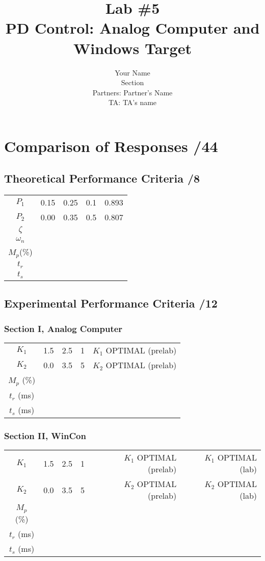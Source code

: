 \documentclass{article}
\title{Lab \#5\\{\sc PD Control: Analog Computer and Windows Target}}
\author{Your Name\\ Section\\
  Partners: Partner's Name\\
  TA: TA's name}
\newcommand{\score}{\hfill \underline{\hspace{1cm}}/}
\begin{document}
\maketitle
{}
\section{\sc Comparison of Responses \rm \score 44}
\subsection{Theoretical Performance Criteria \score 8}
\begin{center}
\begin{tabular}{crrrr}
$P_1$	&	0.15	&	0.25	&	0.1	&	0.893	\\
$P_2$	&	0.00	&	0.35	&	0.5	&	0.807	\\
\hline
$\zeta$	&	& & &	\\
$\omega_n$	& & &	\\
$M_p$(\%) & & &	\\
$t_r$	& & & &	\\
$t_s$	&	& & &	
\end{tabular}
\end{center}

\subsection{Experimental Performance Criteria \score 12}
\subsubsection{Section I, Analog Computer}
\begin{center}
\begin{tabular}{crrrr}
$K_1$	&	1.5	&	2.5	&	1	&	$K_1$ OPTIMAL (prelab) 	\\
$K_2$	&	0.0	&	3.5	&	5	&  $K_2$ OPTIMAL (prelab) \\
\hline
$M_p$ (\%)	& & & &			\\
$t_r$ (ms)	&	& & &		\\
$t_s$ (ms)	&	& & &	
\end{tabular}
\end{center}

\subsubsection{Section II, WinCon}
\begin{center}
\begin{tabular}{crrrrr}
$K_1$	&	1.5	&	2.5	&	1	&	$K_1$ OPTIMAL (prelab) & $K_1$ OPTIMAL (lab) \\
$K_2$	&	0.0	&	3.5	&	5	&	$K_2$ OPTIMAL (prelab) & $K_2$ OPTIMAL (lab) \\
\hline
$M_p$ (\%)	&	& & & & 	\\
$t_r$ (ms)	&	& & & & 	\\
$t_s$ (ms)	&	& & & & 	
\end{tabular}
\end{center}
\end{document}
